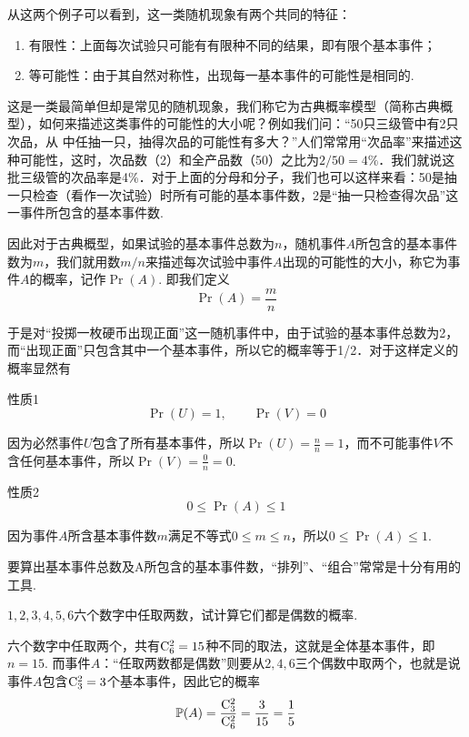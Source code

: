 从这两个例子可以看到，这一类随机现象有两个共同的特征：
\begin{enumerate}[(1)]
    \item 有限性：上面每次试验只可能有有限种不同的结果，即有限个基本事件；
    \item 等可能性：由于其自然对称性，出现每一基本事件的可能性是相同的.
\end{enumerate}

这是一类最简单但却是常见的随机现象，我们称它为古典概率模型（简称古典概型），如何来描述这类事件的可能性的大小呢？例如我们问：“50只三级管中有2只次品，从
中任抽一只，抽得次品的可能性有多大？”人们常常用“次品率”来描述这种可能性，这时，次品数（2）和全产品数（50）之比为$2/50=4\%$．我们就说这批三级管的次品率是4\%．对于上面的分母和分子，我们也可以这样来看：50是抽一只检查（看作一次试验）时所有可能的基本事件数，2是“抽一只检查得次品”这一事件所包含的基本事件数.

因此对于古典概型，如果试验的基本事件总数为$n$，随机事件$A$所包含的基本事件数为$m$，我们就用数$m/n$来描述每次试验中事件$A$出现的可能性的大小，称它为事件$A$的概率，记作$\Pr(A)$. 即我们定义
\[\Pr(A)=\frac{m}{n}\]

于是对“投掷一枚硬币出现正面”这一随机事件中，由于试验的基本事件总数为2，而“出现正面”只包含其中一个基本事件，所以它的概率等于1/2．对于这样定义的概率显然有

\begin{blk}
    {性质1} \[\Pr(U)=1,\qquad \Pr(V)=0\]
\end{blk}

因为必然事件$U$包含了所有基本事件，所以$\Pr(U)=\frac{n}{n}=1$，而不可能事件$V$不含任何基本事件，所以$\Pr(V)=\frac{0}{n}=0$.

\begin{blk}
 { 性质2}\[0\le \Pr(A)\le 1\]  
\end{blk}

因为事件$A$所含基本事件数$m$满足不等式$0\le m\le n$，所以$0\le \Pr(A)\le 1$.

要算出基本事件总数及A所包含的基本事件数，“排列”、“组合”常常是十分有用的工具.

\begin{example}
    $1,2,3,4,5,6$六个数字中任取两数，试计算它们都是偶数的概率.
\end{example}

\begin{solution}
    六个数字中任取两个，共有${\rm C}^{2}_{6}=15$种不同的取法，这就是全体基本事件，即$n=15$. 而事件$A$：“任取两数都是偶数”则要从$2,4,6$三个偶数中取两个，也就是说事件$A$包含${\rm C}^{2}_{3}=3$个基本事件，因此它的概率
\[\mathbb{P}(A)=\dfrac{{\rm C}^{2}_{3}}{{\rm C}^{2}_{6}}=\dfrac{3}{15}=\dfrac{1}{5}\]
\end{solution}


